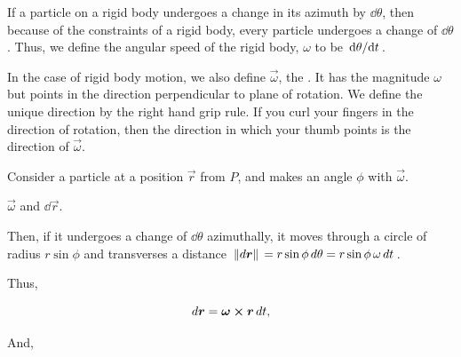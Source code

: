 If a particle on a rigid body undergoes a change in its azimuth by \(\dd{\theta}\),
then because of the constraints of a rigid body, every particle 
undergoes a change of \(\dd{\theta}\). Thus, we define 
the angular speed of the rigid body, \(\omega\) to be \(\dv*{\theta}{t}\).

In the case of rigid body motion, we also define \(\vec{\omega}\), the .
It has the magnitude \(\omega\) but points in the direction perpendicular 
to plane of rotation. We define the unique direction by the right hand grip rule. 
If you curl your fingers in the direction of rotation, then the direction 
in which your thumb points is the direction of \(\vec{\omega}\).

Consider a particle at a position \(\vec{r}\) from \(P\), and makes an angle
\(\phi\) with \(\vec{\omega}\). 

\begin{marginfigure}
    \caption{\(\vec{\omega}\) and \(\dd{\vec{r}}\).}
\end{marginfigure}

Then, if it undergoes a change of \(\dd{\theta}\) azimuthally,
it moves through a circle of radius \(r\sin\phi\)
and transverses a distance \(\norm*{\mathop{}\!{d}{\boldsymbol{r}}} = r\sin\phi\mathop{}\!{d}{\theta} = r\sin\phi\,\omega\mathop{}\!{d}{t}\).

Thus, 

\[\dd{\vec{r}} = \vec{\omega} \cp \vec{r} \dd{t},\]

And, 


